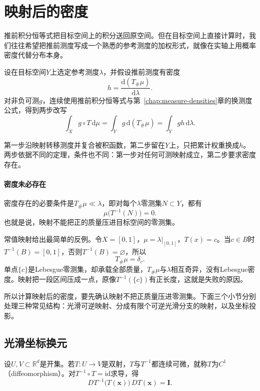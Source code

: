 \section{映射后的密度}
\label{sec:push-mapped-densities}

推前积分恒等式把目标空间上的积分送回原空间。但在目标空间上直接计算时，我们往往希望把推前测度写成一个熟悉的参考测度的加权形式，就像在实轴上用概率密度代替分布本身。

设在目标空间$Y$上选定参考测度$\lambda$，并假设推前测度有密度
\[
h=\frac{\mathrm d(T_\#\mu)}{\mathrm d\lambda}.
\]
对非负可测$g$，连续使用推前积分恒等式与第~\ref{chap:measure-densities}章的换测度公式，得到两步改写
\begin{equation}
\int_Xg\circ T\,\mathrm d\mu=\int_Yg\,\mathrm d(T_\#\mu)=\int_Ygh\,\mathrm d\lambda .
\label{eq:push-two-step}
\end{equation}

第一步沿映射转移测度并复合被积函数，第二步留在$Y$上，只把累计权重换成$h$。两步依据不同的定理，条件也不同：第一步对任何可测映射成立，第二步要求密度存在。

\paragraph{密度未必存在}
密度存在的必要条件是$T_\#\mu\ll\lambda$，即对每个$\lambda$零测集$N\subset Y$，都有
\[
\mu\bigl(T^{-1}(N)\bigr)=0 .
\]
也就是说，映射不能把正的质量压进目标空间的零测集。

常值映射给出最简单的反例。令$X=[0,1]$，$\mu=\lambda|_{[0,1]}$，$T(x)=c$。当$c\in B$时$T^{-1}(B)=[0,1]$，否则$T^{-1}(B)=\varnothing$，所以
\[
T_\#\mu=\delta_c .
\]
单点$\{c\}$是Lebesgue零测集，却承载全部质量，$T_\#\mu$与$\lambda$相互奇异，没有Lebesgue密度。映射把一段区间压成一点，原像$T^{-1}(\{c\})$有正长度，这就是失败的原因。

所以计算映射后的密度，要先确认映射不把正质量压进零测集。下面三个小节分别处理三种常见结构：光滑可逆映射、分成有限个可逆光滑分支的映射，以及坐标投影。

\subsection{光滑坐标换元}
\label{sec:push-smooth-change}

设$U,V\subset\mathbb R^d$是开集。若$T:U\to V$是双射，$T$与$T^{-1}$都连续可微，就称$T$为$C^1$（diffeomorphism）。对$T^{-1}\circ T=\mathrm{id}$求导，得
\[
DT^{-1}\bigl(T(\bm x)\bigr)\,DT(\bm x)=\bm I .
\]

